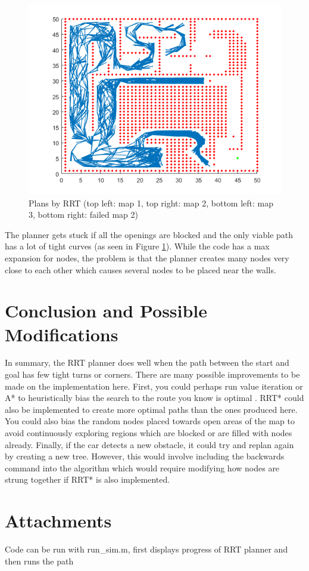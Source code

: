 \documentclass[a4paper, 11pt]{article}
\begin{document}
\begin{figure}[h]
	\includegraphics[scale=0.52]{../Figures/map2_fail.png}
	\caption{Plans by RRT (top left: map 1, top right: map 2, bottom left: map 3, bottom right: failed map 2)}
	\label{fig:maps}
\end{figure} 

The planner gets stuck if all the openings are blocked and the only viable path has a lot of tight curves (as seen in Figure \ref{fig:maps}). While the code has a max expansion for nodes, the problem is that the planner creates many nodes very close to each other which causes several nodes to be placed near the walls. 

%	
%
%	


\section{Conclusion and Possible Modifications}

In summary, the RRT planner does well when the path between the start and goal has few tight turns or corners. There are many possible improvements to be made on the implementation here. First, you could perhaps run value iteration or A* to heuristically bias the search to the route you know is optimal \cite{Urmson2004}. RRT* could also be implemented to create more optimal paths than the ones produced here. You could also bias the random nodes placed towards open areas of the map to avoid continuously exploring regions which are blocked or are filled with nodes already. Finally, if the car detects a new obstacle, it could try and replan again by creating a new tree. However, this would involve including the backwards command into the algorithm which would require modifying how nodes are strung together if RRT* is also implemented. 


\section*{Attachments}
Code can be run with run\_sim.m, first displays progress of RRT planner and then runs the path



\end{document}
